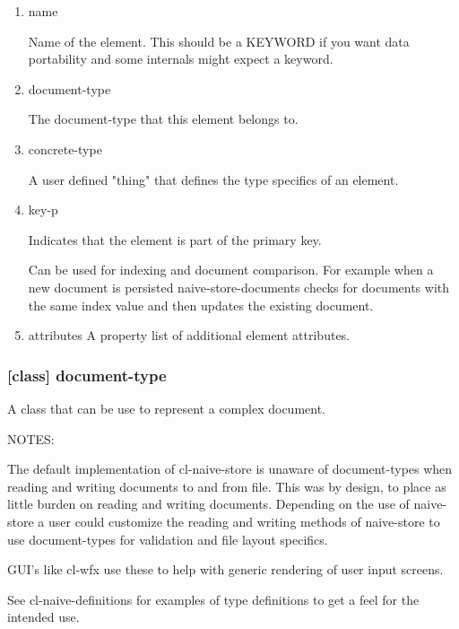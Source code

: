 \documentclass[11pt]{article}
\begin{document}
\begin{enumerate}
\item\relax [accessor] name
\label{sec:orge4bf6ad}

Name of the element. This should be a KEYWORD if you want data
portability and some internals might expect a keyword.

\item\relax [accessor] document-type
\label{sec:org05f153c}

The document-type that this element belongs to.

\item\relax [accessor] concrete-type
\label{sec:org1034ef2}

A user defined "thing" that defines the type specifics of an element.

\item\relax [accessor] key-p
\label{sec:org3ee74c1}

Indicates that the element is part of the primary key.

Can be used for indexing and document comparison. For example when a
new document is persisted naive-store-documents checks for documents
with the same index value and then updates the existing document.

\item\relax [accessor] attributes
\label{sec:org00cd77d}
A property list of additional element attributes.
\end{enumerate}

\subsubsection{[class] document-type}
\label{sec:org9158248}

A class that can be use to represent a complex document.

NOTES:

The default implementation of cl-naive-store is unaware of
document-types when reading and writing documents to and from
file. This was by design, to place as little burden on reading and
writing documents. Depending on the use of naive-store a user could
customize the reading and writing methods of naive-store to use
document-types for validation and file layout specifics.

GUI's like cl-wfx use these to help with generic rendering of user
input screens.

See cl-naive-definitions for examples of type
definitions to get a feel for the intended use.
\end{document}

